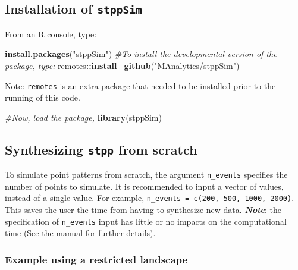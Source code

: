 \documentclass[
  16pt,
]{article}
\newenvironment{Shaded}{\begin{snugshade}}{\end{snugshade}}
\newcommand{\CommentTok}[1]{\textcolor[rgb]{0.56,0.35,0.01}{\textit{#1}}}
\newcommand{\KeywordTok}[1]{\textcolor[rgb]{0.13,0.29,0.53}{\textbf{#1}}}
\newcommand{\NormalTok}[1]{#1}
\newcommand{\OperatorTok}[1]{\textcolor[rgb]{0.81,0.36,0.00}{\textbf{#1}}}
\newcommand{\StringTok}[1]{\textcolor[rgb]{0.31,0.60,0.02}{#1}}
\begin{document}
\hypertarget{installation-of-stppsim}{%
\subsection{\texorpdfstring{Installation of
\texttt{stppSim}}{Installation of stppSim}}\label{installation-of-stppsim}}

From an R console, type:

\begin{Shaded}
\begin{Highlighting}[]
\KeywordTok{install.packages}\NormalTok{(}\StringTok{"stppSim"}\NormalTok{)}
\CommentTok{\#To install the developmental version of the package, type:}
\NormalTok{remotes}\OperatorTok{::}\KeywordTok{install\_github}\NormalTok{(}\StringTok{"MAnalytics/stppSim"}\NormalTok{)}
\end{Highlighting}
\end{Shaded}

Note: \texttt{remotes} is an extra package that needed to be installed
prior to the running of this code.

\begin{Shaded}
\begin{Highlighting}[]
\CommentTok{\#Now, load the package,}
\KeywordTok{library}\NormalTok{(stppSim)}
\end{Highlighting}
\end{Shaded}

\hypertarget{synthesizing-stpp-from-scratch}{%
\subsection{\texorpdfstring{Synthesizing \texttt{stpp} from
scratch}{Synthesizing stpp from scratch}}\label{synthesizing-stpp-from-scratch}}

To simulate point patterns from scratch, the argument \texttt{n\_events}
specifies the number of points to simulate. It is recommended to input a
vector of values, instead of a single value. For example,
\texttt{n\_events\ =\ c(200,\ 500,\ 1000,\ 2000)}. This saves the user
the time from having to synthesize new data. \textbf{\emph{Note}}: the
specification of \texttt{n\_events} input has little or no impacts on
the computational time (See the manual for further details).

\hypertarget{example-using-a-restricted-landscape}{%
\subsubsection{Example using a restricted
landscape}\label{example-using-a-restricted-landscape}}
\end{document}
